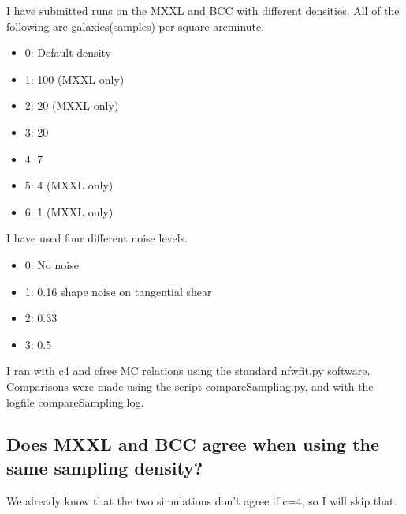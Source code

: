 \documentclass[11pt]{article}
\begin{document}
I have submitted runs on the MXXL and BCC with different densities. All of the following are galaxies(samples) per square arcminute.
\begin{itemize}
\item 0: Default density
\item 1: 100 (MXXL only)
\item 2: 20 (MXXL only)
\item 3: 20
\item 4: 7
\item 5: 4  (MXXL only)
\item 6: 1  (MXXL only)
\end{itemize}

I have used four different noise levels.
\begin{itemize}
\item 0: No noise
\item 1: 0.16 shape noise on tangential shear
\item 2: 0.33
\item 3: 0.5
\end{itemize}

I ran with c4 and cfree MC relations using the standard nfwfit.py software. Comparisons were made using the script compareSampling.py, and with the logfile compareSampling.log.



\subsection{Does MXXL and BCC agree when using the same sampling density?}

We already know that the two simulations don't agree if c=4, so I will skip that.
\end{document}
